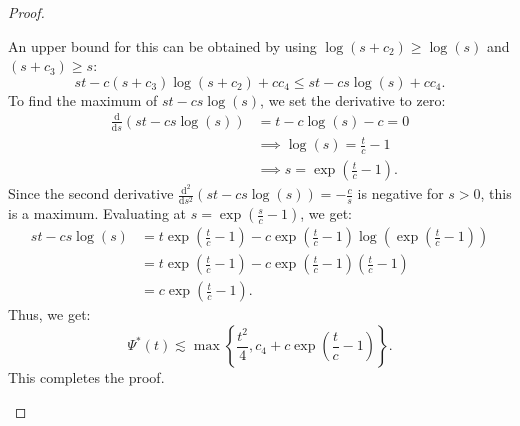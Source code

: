 \documentclass[a4paper,11pt]{amsart}
\numberwithin{equation}{section}
\begin{document}
\begin{proof}
\begin{enumerate}
			An upper bound for this can be obtained by using $\log(s+c_2) \geq \log(s)$ and $(s+c_3) \geq s$:
			$$
			st - c(s+c_3) \log(s+c_2) + cc_4 \leq st - cs \log(s) + cc_4.
			$$
			To find the maximum of $st - cs \log(s)$, we set the derivative to zero:
			\begin{align*}
				\frac{\mathrm{d}}{\mathrm{d}s} (st - cs \log(s)) & = t - c\log(s) - c = 0 \\ & \implies \log(s) = \frac{t}{c} - 1 \\ & \implies s = \exp \left(\frac{t}{c} - 1 \right).
			\end{align*}
			Since the second derivative $\frac{\mathrm{d}^2}{\mathrm{d}s^2} (st - c s \log(s)) = -\frac{c}{s}$ is negative for $s > 0$, this is a maximum. 
			Evaluating at $s = \exp \left(\frac{s}{c} - 1 \right)$, we get:
			\begin{align*}
				st - c s \log(s) & = t \exp \left(\frac{t}{c}-1 \right) - c\exp \left(\frac{t}{c}-1 \right) \log \left(\exp\left(\frac{t}{c}-1 \right) \right) \\ & = t \exp \left(\frac{t}{c}-1\right) - c\exp \left(\frac{t}{c}-1 \right) \left(\frac{t}{c}-1\right) \\ & = c\exp \left(\frac{t}{c}-1 \right).
			\end{align*}
			Thus, we get:
			$$
			\Psi^*(t) \lesssim\max \left\{ \frac{t^2}{4}, c_4 + c\exp \left(\frac{t}{c}-1 \right) \right\}.
			$$
			This completes the proof.
		\end{enumerate}
		
	\end{proof}
	
\end{document}
